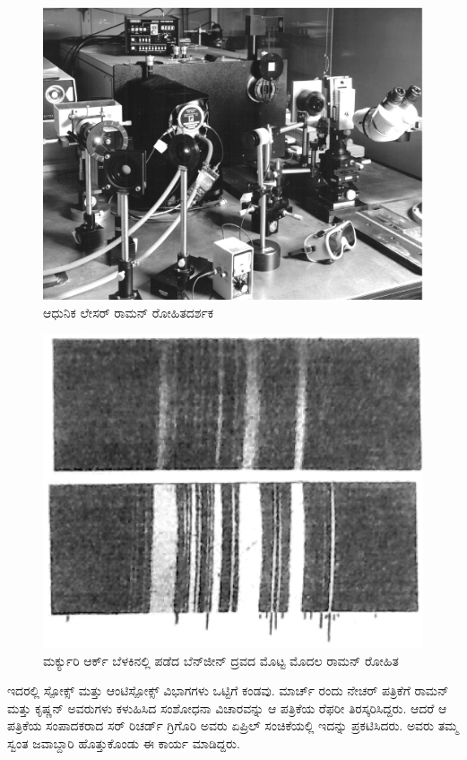 \begin{figure}[!htbp]
\includegraphics[scale=0.2]{"images/2.jpg"}
\caption{ಆಧುನಿಕ ಲೇಸರ್ ರಾಮನ್ ರೋಹಿತದರ್ಶಕ}
\end{figure}


\begin{figure}[!htbp]
\includegraphics[scale=0.19]{"images/2a.jpg"}
\caption{ಮರ್ಕ್ಯುರಿ ಆರ್ಕ್ ಬೆಳಕಿನಲ್ಲಿ ಪಡೆದ ಬೆನ್‍ಜೀನ್ ದ್ರವದ ಮೊಟ್ಟ ಮೊದಲ ರಾಮನ್ ರೋಹಿತ\\}
\end{figure}

ಇದರಲ್ಲಿ ಸ್ಪೋಕ್ಸ್ ಮತ್ತು ಆಂಟಿಸ್ಪೋಕ್ಸ್ ವಿಭಾಗಗಳು ಒಟ್ಟಿಗೆ ಕಂಡವು.  ಮಾರ್ಚ್ ರಂದು ನೇಚರ್ ಪತ್ರಿಕೆಗೆ ರಾಮನ್ ಮತ್ತು ಕೃಷ್ಣನ್ ಅವರುಗಳು ಕಳುಹಿಸಿದ ಸಂಶೋಧನಾ ವಿಚಾರವನ್ನು ಆ ಪತ್ರಿಕೆಯ ರೆಫರೀ ತಿರಸ್ಕರಿಸಿದ್ದರು. ಆದರೆ ಆ ಪತ್ರಿಕೆಯ ಸಂಪಾದಕರಾದ ಸರ್ ರಿಚರ್ಡ್ ಗ್ರಿಗೊರಿ ಅವರು  ಏಪ್ರಿಲ್ ಸಂಚಿಕೆಯಲ್ಲಿ ಇದನ್ನು ಪ್ರಕಟಿಸಿದರು. ಅವರು ತಮ್ಮ ಸ್ವಂತ ಜವಾಬ್ದಾರಿ ಹೊತ್ತುಕೊಂಡು ಈ ಕಾರ್ಯ ಮಾಡಿದ್ದರು.

